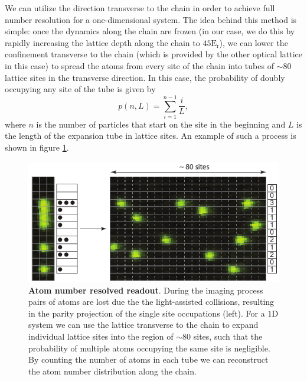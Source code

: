 We can utilize the direction transverse to the chain in order to achieve full number resolution for a one-dimensional system. The idea behind this method is simple: once the dynamics along the chain are frozen (in our case, we do this by rapidly increasing the lattice depth along the chain to $45 \mathrm{E_{r}}$), we can lower the confinement transverse to the chain (which is provided by the other optical lattice in this case) to spread the atoms from every site of the chain into tubes of $\sim 80$ lattice sites in the transverse direction. In this case, the probability of doubly occupying any site of the tube is given by
\begin{equation}
p(n,L) = \sum_{i=1}^{n-1}\frac{i}{L},
\end{equation}
where $n$ is the number of particles that start on the site in the beginning and $L$ is the length of the expansion tube in lattice sites. An example of such a process is shown in figure \ref{fig:CTE_fullcounting}.

\begin{figure}[t]
	\centering
	\includegraphics[scale=1]{figures/CTE_fullcounting.pdf}
	\caption{{\bf Atom number resolved readout}. During the imaging process pairs of atoms are lost due the the light-assisted collisions, resulting in the parity projection of the single site occupations (left). For a $1\mathrm{D}$ system we can use the lattice transverse to the chain to expand individual lattice sites into the region of $\sim 80$ sites, such that the probability of multiple atoms occupying the same site is negligible. By counting the number of atoms in each tube we can reconstruct the atom number distribution along the chain.}
	\label{fig:CTE_fullcounting}
\end{figure}

